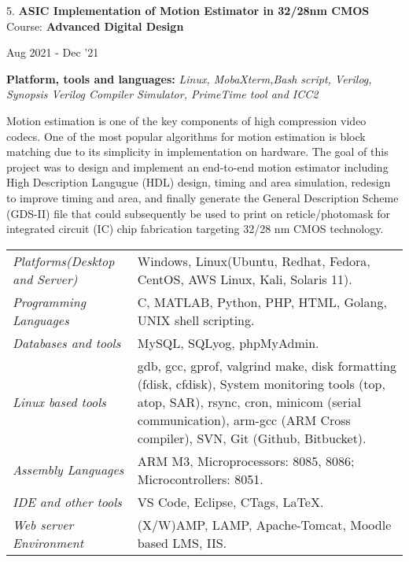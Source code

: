 \documentclass[10pt]{article}
\renewcommand{\section}[2]%
        {\pagebreak[3]\vspace{1.3\baselineskip}%
         \phantomsection\addcontentsline{toc}{section}{#1}%
         \hspace{0in}%
         \marginpar{
         \raggedright \scshape #1}#2}
\newenvironment{innerlist}[1][\enskip\textbullet]%
        {\begin{compactitem}[#1]}{\end{compactitem}}
\newenvironment{loneinnerlist}[1][\enskip\textbullet]%
        {\vspace{-\baselineskip}\begin{compactitem}[#1]}
        {\end{compactitem}\vspace{-.6\baselineskip}}
\begin{document}
\begin{loneinnerlist}
\begin{loneinnerlist}
\item[5.]\textbf{ASIC Implementation of Motion Estimator in 32/28nm CMOS} \\ 
\vspace{4pt}
Course: \textbf{Advanced Digital Design} \\
\vspace*{-28pt} \begin{flushright} Aug 2021 - Dec '21 \end{flushright}
\textbf{Platform, tools and languages:} \emph{Linux, MobaXterm,Bash script, Verilog, Synopsis Verilog Compiler Simulator, PrimeTime tool and ICC2}
\vspace*{2pt}
\begin{innerlist} \item Motion estimation is one of the key components of high compression video codecs. One of the most popular algorithms for motion estimation is block matching due to its simplicity in implementation on hardware. The goal of this project was to design and implement an end-to-end motion estimator including High Description Langugue (HDL) design, timing and area simulation, redesign to improve timing and area, and finally generate the General Description Scheme (GDS-II) file that could subsequently be used to print on reticle/photomask for integrated circuit (IC) chip fabrication targeting 32/28 nm CMOS technology.
\end{innerlist}  \vspace*{4pt}
\end{loneinnerlist}%


\section{Skills}
%
\begin{tabular}[t]{l p{2.9in}}
\emph{Platforms(Desktop and Server)}  &  Windows, Linux(Ubuntu, Redhat, Fedora, CentOS, AWS Linux, Kali, Solaris 11).\\
\emph{Programming Languages}  & C, MATLAB, Python, PHP, HTML, Golang, UNIX shell scripting.\\
\emph{Databases and tools}  & MySQL, SQLyog, phpMyAdmin.\\
\emph{Linux based tools}  &  gdb, gcc, gprof, valgrind make, disk formatting (fdisk, cfdisk), System monitoring tools (top, atop, SAR), rsync, cron, minicom (serial communication), arm-gcc (ARM Cross compiler), SVN, Git (Github, Bitbucket).\\
\emph{Assembly Languages}  &  ARM M3, Microprocessors: 8085, 8086; Microcontrollers: 8051.\\
\emph{IDE and other tools}  & VS Code, Eclipse, CTags, \LaTeX{}.\\
\emph{Web server Environment}  & (X/W)AMP, LAMP, Apache-Tomcat, Moodle based LMS, IIS.\\
\end{tabular}


\end{loneinnerlist}
\end{document}
